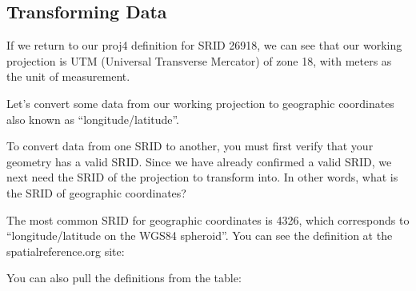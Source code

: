\documentclass[a4paper,11pt,english]{sphinxmanual}
\begin{document}
\subsection{Transforming Data}
\label{\detokenize{basic:transforming-data}}
If we return to our proj4 definition for SRID 26918, we can see that our working projection is UTM (Universal Transverse Mercator) of zone 18, with meters as the unit of measurement.

\begin{sphinxVerbatim}[commandchars=\\\{\}]
     
\end{sphinxVerbatim}

Let’s convert some data from our working projection to geographic coordinates \textendash{} also known as “longitude/latitude”.

To convert data from one SRID to another, you must first verify that your geometry has a valid SRID. Since we have already confirmed a valid SRID, we next need the SRID of the projection to transform into. In other words, what is the SRID of geographic coordinates?

The most common SRID for geographic coordinates is 4326, which corresponds to “longitude/latitude on the WGS84 spheroid”. You can see the definition at the spatialreference.org site:
\begin{quote}

\end{quote}

You can also pull the definitions from the  table:

\begin{sphinxVerbatim}[commandchars=\\\{\}]
       
\end{sphinxVerbatim}
\end{document}
